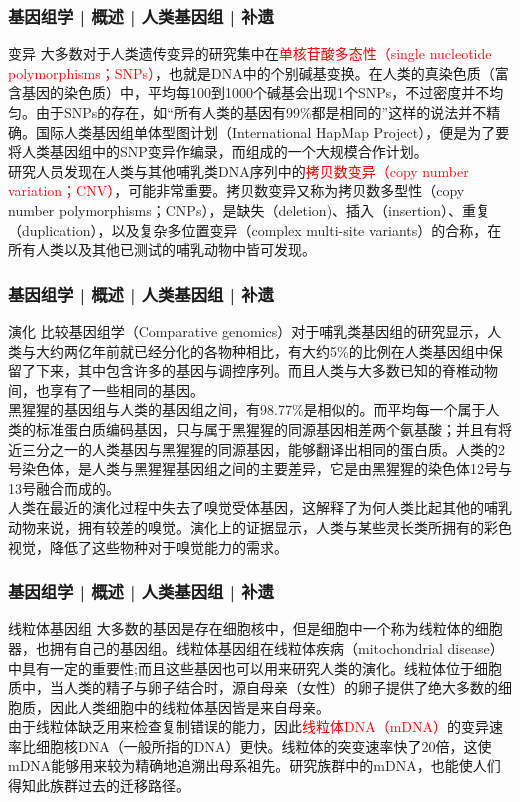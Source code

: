\begin{frame}
  \frametitle{基因组学 | 概述 | 人类基因组 | 补遗}
  \begin{block}{变异}
    大多数对于人类遗传变异的研究集中在\textcolor{red}{单核苷酸多态性（single nucleotide polymorphisms；SNPs）}，也就是DNA中的个别碱基变换。在人类的真染色质（富含基因的染色质）中，平均每100到1000个碱基会出现1个SNPs，不过密度并不均匀。由于SNPs的存在，如“所有人类的基因有99\%都是相同的”这样的说法并不精确。国际人类基因组单体型图计划（International HapMap Project），便是为了要将人类基因组中的SNP变异作编录，而组成的一个大规模合作计划。\\
\vspace{1em}
研究人员发现在人类与其他哺乳类DNA序列中的\textcolor{red}{拷贝数变异（copy number variation；CNV）}，可能非常重要。拷贝数变异又称为拷贝数多型性（copy number polymorphisms；CNPs），是缺失（deletion)、插入（insertion）、重复（duplication），以及复杂多位置变异（complex multi-site variants）的合称，在所有人类以及其他已测试的哺乳动物中皆可发现。
  \end{block}
\end{frame}

\begin{frame}
  \frametitle{基因组学 | 概述 | 人类基因组 | 补遗}
  \begin{block}{演化}
比较基因组学（Comparative genomics）对于哺乳类基因组的研究显示，人类与大约两亿年前就已经分化的各物种相比，有大约5\%的比例在人类基因组中保留了下来，其中包含许多的基因与调控序列。而且人类与大多数已知的脊椎动物间，也享有了一些相同的基因。\\
 \vspace{1em}
黑猩猩的基因组与人类的基因组之间，有98.77\%是相似的。而平均每一个属于人类的标准蛋白质编码基因，只与属于黑猩猩的同源基因相差两个氨基酸；并且有将近三分之一的人类基因与黑猩猩的同源基因，能够翻译出相同的蛋白质。人类的2号染色体，是人类与黑猩猩基因组之间的主要差异，它是由黑猩猩的染色体12号与13号融合而成的。\\
 \vspace{1em}
人类在最近的演化过程中失去了嗅觉受体基因，这解释了为何人类比起其他的哺乳动物来说，拥有较差的嗅觉。演化上的证据显示，人类与某些灵长类所拥有的彩色视觉，降低了这些物种对于嗅觉能力的需求。
  \end{block}
\end{frame}

\begin{frame}
  \frametitle{基因组学 | 概述 | 人类基因组 | 补遗}
  \begin{block}{线粒体基因组}
大多数的基因是存在细胞核中，但是细胞中一个称为线粒体的细胞器，也拥有自己的基因组。线粒体基因组在线粒体疾病（mitochondrial disease）中具有一定的重要性;而且这些基因也可以用来研究人类的演化。线粒体位于细胞质中，当人类的精子与卵子结合时，源自母亲（女性）的卵子提供了绝大多数的细胞质，因此人类细胞中的线粒体基因皆是来自母亲。\\
\vspace{1em}
由于线粒体缺乏用来检查复制错误的能力，因此\textcolor{red}{线粒体DNA（mDNA）}的变异速率比细胞核DNA（一般所指的DNA）更快。线粒体的突变速率快了20倍，这使mDNA能够用来较为精确地追溯出母系祖先。研究族群中的mDNA，也能使人们得知此族群过去的迁移路径。
  \end{block}
\end{frame}

